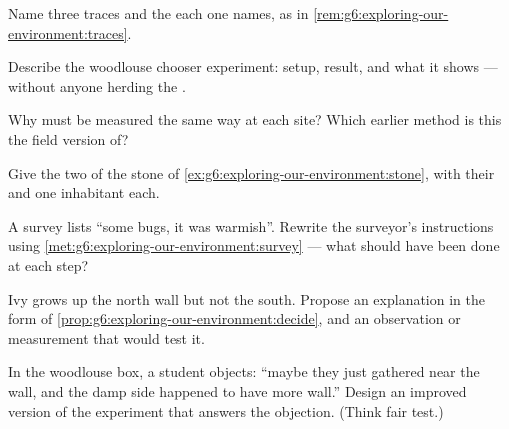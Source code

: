 \begin{exercise}[$\star$]\label{exo:g6:exploring-our-environment:6}
Name three traces and the  each one names, as in
\cref{rem:g6:exploring-our-environment:traces}.
\end{exercise}

\begin{exercise}[$\star\star$]\label{exo:g6:exploring-our-environment:7}
Describe the woodlouse chooser experiment: setup, result,
and what it shows --- without anyone herding the .
\end{exercise}

\begin{exercise}[$\star\star$]\label{exo:g6:exploring-our-environment:8}
Why must  be measured the same way at each site?
Which earlier method is this the field version of?
\end{exercise}

\begin{exercise}[$\star\star$]\label{exo:g6:exploring-our-environment:9}
Give the two  of the stone of
\cref{ex:g6:exploring-our-environment:stone}, with their
 and one inhabitant each.
\end{exercise}

\begin{exercise}[$\star\star$]\label{exo:g6:exploring-our-environment:10}
A survey lists ``some bugs, it was warmish''. Rewrite the
surveyor's instructions using
\cref{met:g6:exploring-our-environment:survey} --- what
should have been done at each step?
\end{exercise}

\begin{exercise}[$\star\star$]\label{exo:g6:exploring-our-environment:11}
Ivy grows up the north wall but not the south. Propose an
explanation in the form of
\cref{prop:g6:exploring-our-environment:decide}, and an
observation or measurement that would test it.
\end{exercise}

\begin{exercise}[$\star\star\star$]\label{exo:g6:exploring-our-environment:12}
In the woodlouse box, a student objects: ``maybe they just
gathered near the wall, and the damp side happened to have
more wall.'' Design an improved version of the experiment
that answers the objection. (Think fair test.)
\end{exercise}

